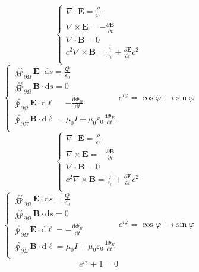 \documentclass{mcmthesis}
\begin{document}
$$
\left\{ \begin{array}{l}
	\nabla \cdot \boldsymbol{E}=\frac{\rho}{\varepsilon _0}\\
	\nabla \times \boldsymbol{E}=-\frac{\partial \boldsymbol{B}}{\partial t}\\
	\nabla \cdot \boldsymbol{B}=0\\
	c^2\nabla \times \boldsymbol{B}=\frac{\boldsymbol{j}}{\varepsilon _0}+\frac{\partial \boldsymbol{E}}{\partial t}c^2\\
\end{array} \right. 
$$
$$
\left\{ \begin{array}{l}
	\oiint_{\partial \Omega}{\boldsymbol{E}\cdot \text{d}s}=\frac{Q}{\varepsilon _0}\\
	\oiint_{\partial \Omega}{\boldsymbol{B}\cdot \text{d}s}=0\\
	\oint_{\partial \Omega}{\boldsymbol{E}\cdot \text{d}\ell}=-\frac{\text{d}\varPhi _B}{\text{d}t}\\
	\oint_{\partial \Sigma}{\boldsymbol{B}\cdot \text{d}\ell}=\mu _0I+\mu _0\varepsilon _0\frac{\text{d}\varPhi _E}{\text{d}t}\\
\end{array} \right. e^{i\varphi}=\cos \varphi +i\sin \varphi 
$$
$$
\left\{ \begin{array}{l}
	\nabla \cdot \boldsymbol{E}=\frac{\rho}{\varepsilon _0}\\
	\nabla \times \boldsymbol{E}=-\frac{\partial \boldsymbol{B}}{\partial t}\\
	\nabla \cdot \boldsymbol{B}=0\\
	c^2\nabla \times \boldsymbol{B}=\frac{\boldsymbol{j}}{\varepsilon _0}+\frac{\partial \boldsymbol{E}}{\partial t}c^2\\
\end{array} \right. 
$$
$$
\left\{ \begin{array}{l}
	\oiint_{\partial \Omega}{\boldsymbol{E}\cdot \text{d}s}=\frac{Q}{\varepsilon _0}\\
	\oiint_{\partial \Omega}{\boldsymbol{B}\cdot \text{d}s}=0\\
	\oint_{\partial \Omega}{\boldsymbol{E}\cdot \text{d}\ell}=-\frac{\text{d}\varPhi _B}{\text{d}t}\\
	\oint_{\partial \Sigma}{\boldsymbol{B}\cdot \text{d}\ell}=\mu _0I+\mu _0\varepsilon _0\frac{\text{d}\varPhi _E}{\text{d}t}\\
\end{array} \right. e^{i\varphi}=\cos \varphi +i\sin \varphi 
$$
$$
e^{i\pi}+1=0
$$
\end{document}
